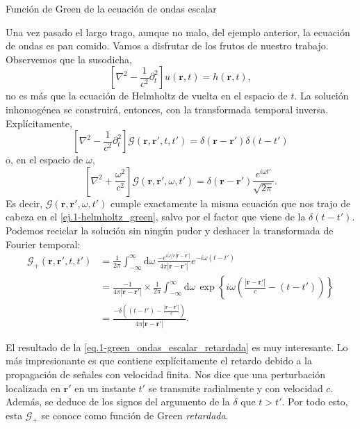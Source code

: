 \begin{example}
    {Función de Green de la ecuación de ondas escalar
    \label{ej.1-dalambertian_green}    
    }

    Una vez pasado el largo trago, aunque no malo, del ejemplo anterior, la ecuación de ondas es pan comido. Vamos a disfrutar de los frutos de nuestro trabajo. Observemos que la susodicha,
    \begin{equation}
        \left[\nabla^2 - \frac{1}{c^2}\partial_t^2\right]u(\mathbf{r}, t) = h(\mathbf{r}, t),
    \end{equation}
    no es más que la ecuación de Helmholtz de vuelta en el espacio de \(t\). La solución inhomogénea se construirá, entonces, con la transformada temporal inversa. Explícitamente,
    \begin{equation*}
        \left[\nabla^2 - \frac{1}{c^2}\partial_t^2\right]\mathcal{G}(\mathbf{r}, \mathbf{r}', t, t') = \delta(\mathbf{r}-\mathbf{r}')\delta(t-t')
    \end{equation*}
    o, en el espacio de \(\omega\),
    \begin{equation*}
        \left[\nabla^2 + \frac{\omega^2}{c^2}\right]\mathcal{G}(\mathbf{r}, \mathbf{r}', \omega, t') = \delta(\mathbf{r}-\mathbf{r}')\frac{e^{i\omega t'}}{\sqrt{2\pi}}.
    \end{equation*}
    Es decir, \(\mathcal{G}(\mathbf{r}, \mathbf{r}', \omega, t')\) cumple exactamente la misma ecuación que nos trajo de cabeza en el \cref{ej.1-helmholtz_green}, salvo por el factor que viene de la \(\delta(t-t')\). Podemos reciclar la solución sin ningún pudor y deshacer la transformada de Fourier temporal:
    \begin{align}
        \nonumber
        \mathcal{G}_+(\mathbf{r}, \mathbf{r}', t, t') &= \frac{1}{2\pi}\int_{-\infty}^{\infty}\mathrm{d}\omega\, \frac{-e^{i\omega/c|\mathbf{r}-\mathbf{r}'|}}{4\pi|\mathbf{r}-\mathbf{r}'|}e^{-i\omega(t-t')}\\
        \nonumber
        &=\frac{-1}{4\pi|\mathbf{r}-\mathbf{r}'|} \times\frac{1}{2\pi}\int_{-\infty}^{\infty}\mathrm{d}\omega\, \exp\left\{i\omega\left(\frac{|\mathbf{r}-\mathbf{r}'|}{c} - (t-t')\right)\right\}\\
        \label{eq.1-green_ondas_escalar_retardada}
        &=\frac{-\delta\left((t-t') - \frac{|\mathbf{r}-\mathbf{r}'|}{c} \right)}{4\pi|\mathbf{r}-\mathbf{r}'|}.
    \end{align}
    
    El resultado de la \cref{eq.1-green_ondas_escalar_retardada} es muy interesante. Lo más impresionante es que contiene explícitamente el retardo debido a la propagación de señales con velocidad finita. Nos dice que una perturbación localizada en \(\mathbf{r}'\) en un instante \(t'\) se transmite radialmente y con velocidad \(c\). Además, se deduce de los signos del argumento de la \(\delta\) que \(t>t'\). Por todo esto, esta \(\mathcal{G}_+\) se conoce como función de Green \emph{retardada}.


\end{example}
